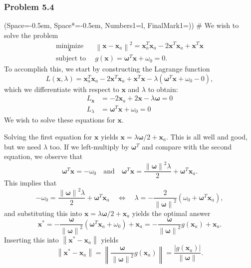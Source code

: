 \documentclass[12pt, a4paper]{article}
\newcommand{\listSpace}{-0.5em}%
\newcommand{\vect}[1]{\bm{#1}}
\newcommand{\norm}[1]{\left\lVert#1\right\rVert}
\newcommand{\abs}[1]{\left\lvert#1\right\rvert}
\begin{document}
\subsubsection*{Problem 5.4}
\begin{easylist}[enumerate]
	\ListProperties(Space=\listSpace, Space*=\listSpace, Numbers1=l, FinalMark1={)})
	# We wish to solve the problem
	\begin{align*}
	\underset{\vect{x}}{\operatorname{minimize}} \, & \norm{\vect{x} - \vect{x}_a}^2 =
		\vect{x}_a^T \vect{x}_a - 2\vect{x}^T \vect{x}_a + \vect{x}^T \vect{x} \\
		\text{subject to } \, & g(\vect{x}) = \vect{\omega}^T \vect{x} + \omega_0 = 0.
	\end{align*}
	To accomplish this, we start by constructing the Lagrange function
	\begin{equation*}
		L(\vect{x}, \lambda) = \vect{x}_a^T \vect{x}_a - 2\vect{x}^T \vect{x}_a + \vect{x}^T \vect{x} - \lambda( \vect{\omega}^T \vect{x} + \omega_0 - 0 ),
	\end{equation*}
	which we differentiate with respect to $\vect{x}$ and $\lambda$ to obtain:
	\begin{align*}
		L_{\vect{x}} &= -2 \vect{x}_a + 2 \vect{x} - \lambda \vect{\omega} = 0 \\
		L_\lambda &= \vect{\omega}^T \vect{x} + \omega_0 = 0
	\end{align*}
	We wish to solve these equations for $\vect{x}$.
	
	Solving the first equation for $\vect{x}$ yields $\vect{x} = \lambda \vect{\omega} / 2 + \vect{x}_a$.
	This is all well and good, but we need $\lambda$ too.
	If we left-multiply by $\vect{\omega}^T$ and compare with the second equation, we observe that
	\begin{equation*}
		\vect{\omega}^T \vect{x} 
		= -\omega_0 \quad \text{and} 
		\quad 
		\vect{\omega}^T \vect{x} 
		= 
		\frac{\norm{\vect{\omega}}^2 \lambda}{2} + \vect{\omega}^T \vect{x}_a.
	\end{equation*}
	This implies that
	\begin{equation*}
		-\omega_0 =  \frac{\norm{\vect{\omega}}^2 \lambda}{2} + \vect{\omega}^T \vect{x}_a \quad \Leftrightarrow \quad \lambda = - \frac{2}{\norm{\vect{\omega}}^2}\left( \omega_0 + \vect{\omega}^T \vect{x}_a \right),
	\end{equation*}
	and substituting this into $\vect{x} = \lambda \vect{\omega} / 2 + \vect{x}_a$ yields the optimal answer
	\begin{equation}
	\label{eqn:ch5_prob4}
		\vect{x}^* = -\frac{\vect{\omega}}{\norm{\vect{\omega}}^2} \left( \vect{\omega}^T \vect{x}_a + \omega_0 \right) + \vect{x}_a = - \frac{\vect{\omega}}{\norm{\vect{\omega}}^2} g(\vect{x}_a) + \vect{x}_a.
	\end{equation}
	Inserting this into $\norm{\vect{x}^* - \vect{x}_a}$ yields 
	\begin{equation*}
		\norm{\vect{x}^* - \vect{x}_a}=
		\norm{\frac{\vect{\omega}}{\norm{\vect{\omega}}^2} g(\vect{x}_a)}
		= \frac{\abs{g(\vect{x}_a)}}{\norm{\vect{\omega}}}.
	\end{equation*}
	

\end{easylist}
\end{document}
